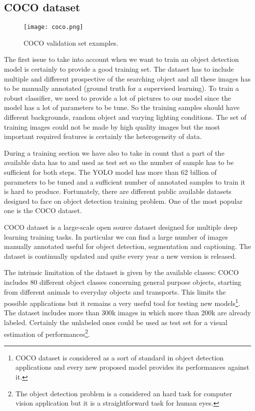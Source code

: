 \documentclass{standalone}
\begin{document}
\subsection[COCO]{COCO dataset}\label{obj_detection:coco}

\begin{center}
\begin{figure}[htbp]
\centering
\texttt{[image: coco.png]}
\caption{COCO validation set examples.
}
\label{fig:coco}
\end{figure}
\end{center}

The first issue to take into account when we want to train an object detection model is certainly to provide a good training set.
The dataset has to include multiple and different prospective of the searching object and all these images has to be manually annotated (ground truth for a supervised learning).
To train a robust classifier, we need to provide a lot of pictures to our model since the model has a lot of parameters to be tune.
So the training samples should have different backgrounds, random object and varying lighting conditions.
The set of training images could not be made by high quality images but the most important required features is certainly the heterogeneity of data.

During a training section we have also to take in count that a part of the available data has to  and used as test set so the number of sample has to be sufficient for both steps.
The YOLO model has more than 62 billion of parameters to be tuned and a sufficient number of annotated samples to train it is hard to produce.
Fortunately, there are different public available datasets designed to face on object detection training problem.
One of the most popular one is the COCO dataset.

COCO dataset is a large-scale open source dataset designed for multiple deep learning training tasks.
In particular we can find a large number of images manually annotated useful for object detection, segmentation and captioning.
The dataset is continually updated and quite every year a new version is released.

The intrinsic limitation of the dataset is given by the available classes: COCO includes 80 different object classes concerning general purpose objects, starting from different animals to everyday objects and transports.
This limits the possible applications but it remains a very useful tool for testing new models\footnote{
  COCO dataset is considered as a sort of standard in object detection applications and every new proposed model provides its performances against it.
}.
The dataset includes more than 300k images in which more than 200k are already labeled.
Certainly the unlabeled ones could be used as test set for a visual estimation of performances\footnote{
  The object detection problem is a considered an hard task for computer vision application but it is a straightforward task for human eyes.
}.
\end{document}
